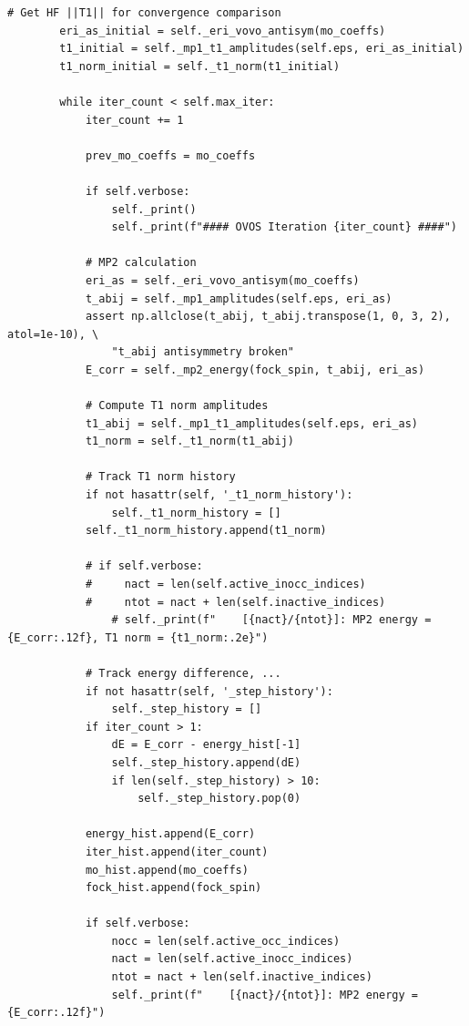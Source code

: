 \begin{lstlisting}[style=python, caption={...}, label=lst:full_code]
        # Get HF ||T1|| for convergence comparison
        eri_as_initial = self._eri_vovo_antisym(mo_coeffs)
        t1_initial = self._mp1_t1_amplitudes(self.eps, eri_as_initial)
        t1_norm_initial = self._t1_norm(t1_initial)

        while iter_count < self.max_iter:
            iter_count += 1

            prev_mo_coeffs = mo_coeffs

            if self.verbose:
                self._print()
                self._print(f"#### OVOS Iteration {iter_count} ####")

            # MP2 calculation
            eri_as = self._eri_vovo_antisym(mo_coeffs)
            t_abij = self._mp1_amplitudes(self.eps, eri_as)
            assert np.allclose(t_abij, t_abij.transpose(1, 0, 3, 2), atol=1e-10), \
                "t_abij antisymmetry broken"
            E_corr = self._mp2_energy(fock_spin, t_abij, eri_as)
            
            # Compute T1 norm amplitudes
            t1_abij = self._mp1_t1_amplitudes(self.eps, eri_as)
            t1_norm = self._t1_norm(t1_abij)

            # Track T1 norm history
            if not hasattr(self, '_t1_norm_history'):
                self._t1_norm_history = []
            self._t1_norm_history.append(t1_norm)

            # if self.verbose:
            #     nact = len(self.active_inocc_indices)
            #     ntot = nact + len(self.inactive_indices)
                # self._print(f"    [{nact}/{ntot}]: MP2 energy = {E_corr:.12f}, T1 norm = {t1_norm:.2e}")

            # Track energy difference, ...
            if not hasattr(self, '_step_history'):
                self._step_history = []
            if iter_count > 1:
                dE = E_corr - energy_hist[-1]
                self._step_history.append(dE)
                if len(self._step_history) > 10:
                    self._step_history.pop(0)

            energy_hist.append(E_corr)
            iter_hist.append(iter_count)
            mo_hist.append(mo_coeffs)
            fock_hist.append(fock_spin)

            if self.verbose:
                nocc = len(self.active_occ_indices)
                nact = len(self.active_inocc_indices)
                ntot = nact + len(self.inactive_indices)
                self._print(f"    [{nact}/{ntot}]: MP2 energy = {E_corr:.12f}")


\end{lstlisting}
